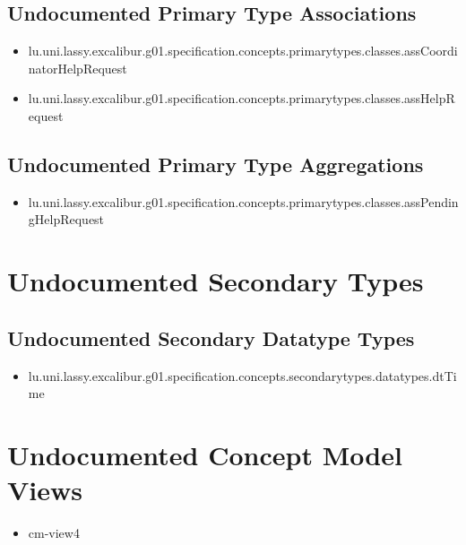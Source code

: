 \subsection[Undocumented Primary Type Associations]{Undocumented Primary Type Associations}
\begin{itemize}
\item lu.uni.lassy.excalibur.g01.specification.concepts.primarytypes.classes.assCoordinatorHelpRequest 
\item lu.uni.lassy.excalibur.g01.specification.concepts.primarytypes.classes.assHelpRequest 
\end{itemize}


\subsection[Undocumented Primary Type Aggregations]{Undocumented Primary Type Aggregations}
\begin{itemize}
\item lu.uni.lassy.excalibur.g01.specification.concepts.primarytypes.classes.assPendingHelpRequest 
\end{itemize}






\section[Undocumented Secondary Types]{Undocumented Secondary Types}


\subsection[Undocumented Secondary Datatype Types]{Undocumented Secondary Datatype Types}
\begin{itemize}
\item lu.uni.lassy.excalibur.g01.specification.concepts.secondarytypes.datatypes.dtTime 
\end{itemize}








\section[Undocumented Concept Model Views]{Undocumented Concept Model Views}
\begin{itemize}
\item cm-view4 
\end{itemize}


